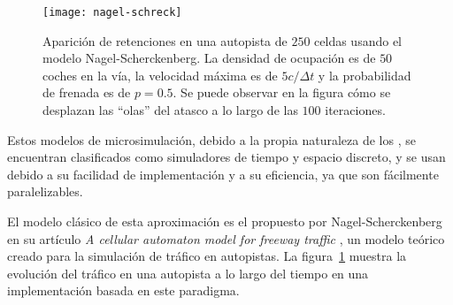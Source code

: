 \begin{figure}[t]
	\centering
	\texttt{[image: nagel-schreck]}
	\caption[Ejemplo de efecto de ondas de choque en simulación de tipo Nagel-Scherckenberg]{Aparición de retenciones en una autopista de $250$ celdas usando el modelo Nagel-Scherckenberg. La densidad de ocupación es de $50$ coches en la vía, la velocidad máxima es de $5 c/\Delta t$ y la probabilidad de frenada es de $p = 0.5$. Se puede observar en la figura cómo se desplazan las \enquote{olas} del atasco a lo largo de las $100$ iteraciones.}
	\label{fig:nagel-schreck}
\end{figure}


Estos modelos de microsimulación, debido a la propia naturaleza de los , se encuentran clasificados como simuladores de tiempo y espacio discreto, y se usan debido a su facilidad de implementación y a su eficiencia, ya que son fácilmente paralelizables.

El modelo clásico de esta aproximación es el propuesto por Nagel-Scherckenberg en su artículo \textit{A cellular automaton model for freeway traffic} \cite{Nagel1992}, un modelo teórico creado para la simulación de tráfico en autopistas. La figura~\ref{fig:nagel-schreck} muestra la evolución del tráfico en una autopista a lo largo del tiempo en una implementación basada en este paradigma.

